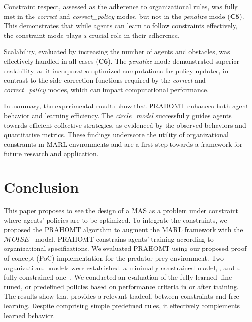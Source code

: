 \documentclass[runningheads]{llncs}
\theoremstyle{freethm}
\theoremstyle{proofoutline}
\newcounter{proof}
\begin{document}
Constraint respect, assessed as the adherence to organizational rules, was fully met in the \textit{correct} and \textit{correct\_policy} modes, but not in the \textit{penalize} mode ($\mathbf{C5}$). This demonstrates that while agents can learn to follow constraints effectively, the constraint mode plays a crucial role in their adherence.

Scalability, evaluated by increasing the number of agents and obstacles, was effectively handled in all cases ($\mathbf{C6}$). The \textit{penalize} mode demonstrated superior scalability, as it incorporates optimized computations for policy updates, in contrast to the side correction functions required by the \textit{correct} and \textit{correct\_policy} modes, which can impact computational performance.

In summary, the experimental results show that PRAHOMT enhances both agent behavior and learning efficiency. The \textit{circle\_model} successfully guides agents towards efficient collective strategies, as evidenced by the observed behaviors and quantitative metrics. These findings underscore the utility of organizational constraints in MARL environments and are a first step towards a framework for future research and application.



\section{Conclusion}\label{sec:conclusion}

This paper proposes to see the design of a MAS as a problem under constraint where agents' policies are to be optimized. To integrate the constraints, we proposed the PRAHOMT algorithm to augment the MARL framework with the $\mathcal{M}OISE^+$ model. PRAHOMT constrains agents' training according to organizational specifications. We evaluated PRAHOMT using our proposed proof of concept (PoC) implementation for the  predator-prey environment. Two organizational models were established: a minimally constrained model, , and a fully constrained one, . We conducted an evaluation of the fully-learned, fine-tuned, or predefined policies based on performance criteria in or after training.
%
The results show that  provides a relevant tradeoff between constraints and free learning. Despite comprising simple predefined rules, it effectively complements learned behavior.
\end{document}
